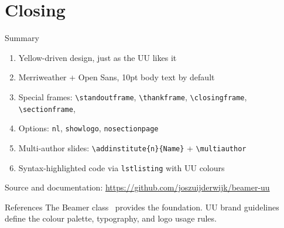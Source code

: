 \documentclass[aspectratio=169,10pt]{beamer}
\begin{document}


\begin{frame}[plain]
\end{frame}


\section{Closing}

\begin{frame}{Summary}
  \begin{enumerate}
    \item Yellow-driven design, just as the UU likes it
    \item Merriweather + Open Sans, 10pt body text by default
    \item Special frames: \texttt{\textbackslash standoutframe}, \texttt{\textbackslash thankframe}, \texttt{\textbackslash closingframe}, \texttt{\textbackslash sectionframe},
    \item Options: \texttt{nl}, \texttt{showlogo}, \texttt{nosectionpage}
    \item Multi-author slides: \texttt{\textbackslash addinstitute\{n\}\{Name\}} + \texttt{\textbackslash multiauthor}
    \item Syntax-highlighted code via \texttt{lstlisting} with UU colours
  \end{enumerate}

  \vskip 12pt
  {\small Source and documentation: \url{https://github.com/joszuijderwijk/beamer-uu}}
\end{frame}


\closingframe

\closingframe[%
  \color{UUblack!30}%
  \rule{2.6cm}{1.2cm}\hspace{0.8cm}%
  \rule{2.6cm}{1.2cm}\hspace{0.8cm}%
  \rule{2.6cm}{1.2cm}%
]

\begin{frame}[allowframebreaks]{References}
  The Beamer class~\cite{tantau2004} provides the foundation.
  UU brand guidelines~\cite{uubrand2025} define the colour palette,
  typography, and logo usage rules.

  \vskip 6pt
  \printbibliography
\end{frame}
\end{document}
